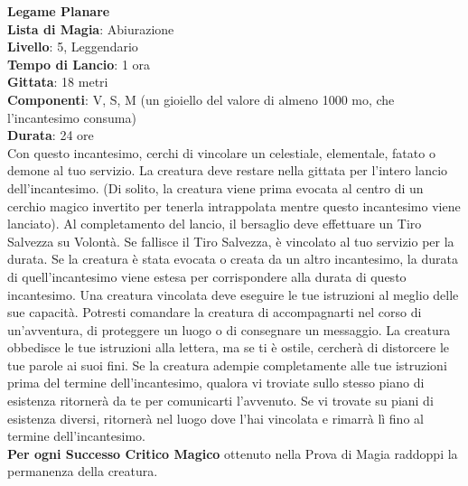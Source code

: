 \documentclass[a4paper,twoside,openany]{book}
\begin{document}
\begin{multicols}{2}
\medskip\textbf{Legame Planare}\\
\textbf{Lista di Magia}: Abiurazione\\
\textbf{Livello}: 5, Leggendario\\
\textbf{Tempo di Lancio}: 1 ora\\
\textbf{Gittata}: 18 metri\\
\textbf{Componenti}: V, S, M (un gioiello del valore di almeno 1000 mo, che l'incantesimo consuma)\\
\textbf{Durata}: 24 ore\\
Con questo incantesimo, cerchi di vincolare un celestiale, elementale, fatato o demone al tuo servizio. La creatura deve restare nella gittata per l'intero lancio dell'incantesimo. (Di solito, la creatura viene prima evocata al centro di un cerchio magico invertito per tenerla intrappolata mentre questo incantesimo viene lanciato). Al completamento del lancio, il bersaglio deve effettuare un Tiro Salvezza su Volontà. Se fallisce il Tiro Salvezza, è vincolato al tuo servizio per la durata. Se la creatura è stata evocata o creata da un altro incantesimo, la durata di quell'incantesimo viene estesa per corrispondere alla durata di questo incantesimo. Una creatura vincolata deve eseguire le tue istruzioni al meglio delle sue capacità. Potresti comandare la creatura di accompagnarti nel corso di un'avventura, di proteggere un luogo o di consegnare un messaggio. La creatura obbedisce le tue istruzioni alla lettera, ma se ti è ostile, cercherà di distorcere le tue parole ai suoi fini. Se la creatura adempie completamente alle tue istruzioni prima del termine dell'incantesimo, qualora vi troviate sullo stesso piano di esistenza ritornerà da te per comunicarti l'avvenuto. Se vi trovate su piani di esistenza diversi, ritornerà nel luogo dove l'hai vincolata e rimarrà lì fino al termine dell'incantesimo.\\
\textbf{Per ogni Successo Critico Magico} ottenuto nella Prova di Magia raddoppi la permanenza della creatura.


\end{multicols}
\end{document}
